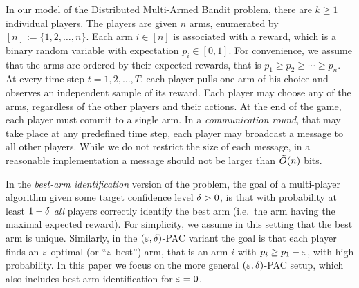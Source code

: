 \documentclass{article} %
\begin{document}
In our model of the Distributed Multi-Armed Bandit problem, there are $k \ge 1$ individual players. The players are given $n$ arms, enumerated by $[n] := \{1,2,\ldots,n\}$.
Each arm $i \in [n]$ is associated with a reward, which is a binary random variable with expectation $p_i \in [0,1]$.
For convenience, we assume that the arms are ordered by their expected rewards, that is $p_1 \ge p_2 \ge \cdots \ge p_n$.
At every time step $t=1,2,\ldots,T$, each player pulls one arm of his choice and observes an independent sample of its reward. 
Each player may choose any of the arms, regardless of the other players and their actions.
At the end of the game, each player must commit to a single arm. 
In a \emph{communication round}, that may take place at any predefined time step, each player may broadcast a message to all other players.
While we do not restrict the size of each message, in a reasonable implementation a message should not be larger than $\tilde{O}(n)$ bits.

In the \emph{best-arm identification} version of the problem, the goal of a multi-player algorithm given some target confidence level $\delta>0$, is that with probability at least $1-\delta$ \emph{all} players correctly identify the best arm (i.e.~the arm having the maximal expected reward).
For simplicity, we assume in this setting that the best arm is unique.
Similarly, in the $(\varepsilon,\delta)$-PAC variant the goal is that each player finds an $\varepsilon$-optimal (or ``$\varepsilon$-best'') arm, that is an arm $i$ with $p_i \ge p_1 - \varepsilon$, with high probability.
In this paper we focus on the more general $(\varepsilon,\delta)$-PAC setup, which also includes best-arm identification for $\varepsilon=0$. 
\end{document}
